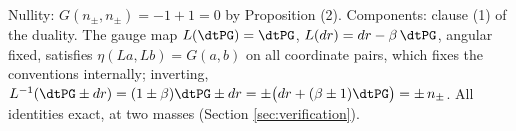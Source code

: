 Nullity: $G(n_\pm, n_\pm) = -1 + 1 = 0$ by Proposition (2). Components: clause (1) of the duality. The gauge map $L(\dtPG) = \dtPG$, $L(dr) = dr - \beta\,\dtPG$, angular fixed, satisfies $\eta(La, Lb) = G(a,b)$ on all coordinate pairs, which fixes the conventions internally; inverting, $L^{-1}(\dtPG \pm dr) = (1 \pm \beta)\dtPG \pm dr = \pm\bigl(dr + (\beta \pm 1)\dtPG\bigr) = \pm\,n_\pm$. All identities exact, at two masses (Section \ref{sec:verification}).
